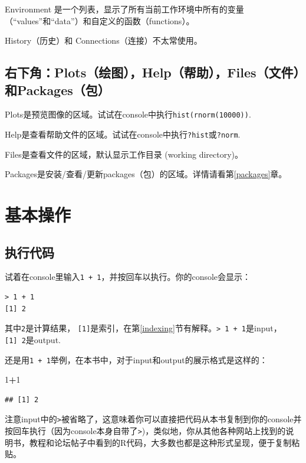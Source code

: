 \documentclass[]{book}
\newenvironment{Shaded}{\begin{snugshade}}{\end{snugshade}}
\newcommand{\DecValTok}[1]{\textcolor[rgb]{0.00,0.00,0.81}{#1}}
\newcommand{\OperatorTok}[1]{\textcolor[rgb]{0.81,0.36,0.00}{\textbf{#1}}}
\begin{document}
Environment 是一个列表，显示了所有当前工作环境中所有的变量（``values''和``data''）和自定义的函数（functions）。

History（历史）和 Connections（连接）不太常使用。

\hypertarget{plotshelpfilespackages}{%
\subsection{右下角：Plots（绘图），Help（帮助），Files（文件）和Packages（包）}\label{plotshelpfilespackages}}

Plots是预览图像的区域。试试在console中执行\texttt{hist(rnorm(10000))}.

Help是查看帮助文件的区域。试试在console中执行\texttt{?hist}或\texttt{?norm}.

Files是查看文件的区域，默认显示工作目录 (working directory)。

Packages是安装/查看/更新packages（包）的区域。详情请看第\ref{packages}章。

\section{基本操作}

\subsection{执行代码}

试着在console里输入\texttt{1\ +\ 1}，并按回车以执行。你的console会显示：

\begin{verbatim}
> 1 + 1
[1] 2
\end{verbatim}

其中\texttt{2}是计算结果， \texttt{{[}1{]}}是索引，在第\ref{indexing}节有解释。\texttt{\textgreater{}\ 1\ +\ 1}是input，\texttt{{[}1{]}\ 2}是output.

还是用\texttt{1\ +\ 1}举例，在本书中，对于input和output的展示格式是这样的：

\begin{Shaded}
\begin{Highlighting}[]
\DecValTok{1}\OperatorTok{+}\DecValTok{1}
\end{Highlighting}
\end{Shaded}

\begin{verbatim}
## [1] 2
\end{verbatim}

注意input中的\texttt{\textgreater{}}被省略了，这意味着你可以直接把代码从本书复制到你的console并按回车执行（因为console本身自带了\texttt{\textgreater{}})，类似地，你从其他各种网站上找到的说明书，教程和论坛帖子中看到的R代码，大多数也都是这种形式呈现，便于复制粘贴。
\end{document}
